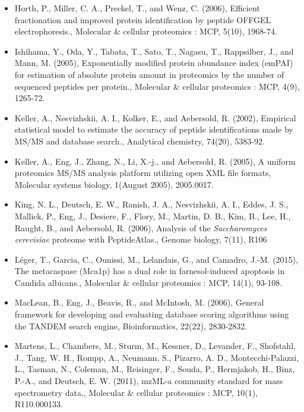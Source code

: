 \begin{itemize}
\item[]{%
Horth, P., Miller, C. A., Preckel, T., and Wenz, C. (2006), Efficient fractionation and improved
protein identification by peptide OFFGEL electrophoresis., Molecular \& cellular proteomics
: MCP, 5(10), 1968-74.
}

\item[]{%
Ishihama, Y., Oda, Y., Tabata, T., Sato, T., Nagasu, T., Rappsilber, J., and Mann, M. (2005),
Exponentially modified protein abundance index (emPAI) for estimation of absolute protein
amount in proteomics by the number of sequenced peptides per protein., 
Molecular \& cellular proteomics : MCP, 4(9), 1265-72.
}

\item[]{%
Keller, A., Nesvizhskii, A. I., Kolker, E., and Aebersold, R. (2002), Empirical statistical model
to estimate the accuracy of peptide identifications made by MS/MS and database search.,
Analytical chemistry, 74(20), 5383-92.
}

\item[]{%
Keller, A., Eng, J., Zhang, N., Li, X.-j., and Aebersold, R. (2005), A uniform proteomics MS/MS
analysis platform utilizing open XML file formats, Molecular systems biology, 1(August
2005), 2005.0017.
}

\item[]{%
King, N. L., Deutsch, E. W., Ranish, J. A., Nesvizhskii, A. I., Eddes, J. S., Mallick, P., Eng, J.,
Desiere, F., Flory, M., Martin, D. B., Kim, B., Lee, H., Raught, B., and Aebersold, R. (2006),
Analysis of the \textit{Saccharomyces cerevisiae} proteome with PeptideAtlas., Genome biology,
7(11), R106
}

\item[]{%
L\'eger, T., Garcia, C., Ounissi, M., Lelandais, G., and Camadro, J.-M. (2015), 
The metacaspase (Mca1p) has a dual role in farnesol-induced apoptosis in Candida albicans.,
Molecular \& cellular proteomics : MCP, 14(1), 93-108.}


\item[]{%
MacLean, B., Eng, J., Beavis, R., and McIntosh, M. (2006), General framework for developing
and evaluating database scoring algorithms using the TANDEM search engine, 
Bioinformatics, 22(22), 2830-2832.
}

\item[]{%
Martens, L., Chambers, M., Sturm, M., Kessner, D., Levander, F., Shofstahl, J., Tang, W. H.,
Rompp, A., Neumann, S., Pizarro, A. D., Montecchi-Palazzi, L., Tasman, N., Coleman, M.,
Reisinger, F., Souda, P., Hermjakob, H., Binz, P.-A., and Deutsch, E. W. (2011), mzML-a
community standard for mass spectrometry data., Molecular \& cellular proteomics : MCP,
10(1), R110.000133.
}


\end{itemize}
